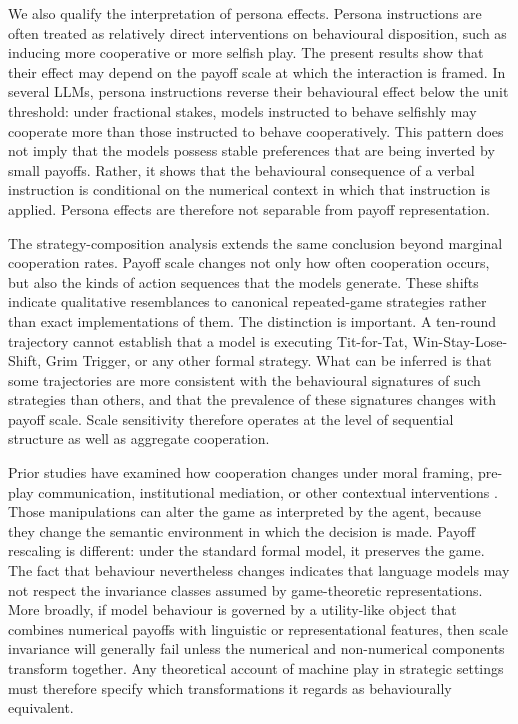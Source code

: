 \documentclass[11pt,a4paper]{article}
\begin{document}
We also qualify the interpretation of persona effects. Persona instructions are often treated as relatively direct interventions on behavioural disposition, such as inducing more cooperative or more selfish play. The present results show that their effect may depend on the payoff scale at which the interaction is framed. In several LLMs, persona instructions reverse their behavioural effect below the unit threshold: under fractional stakes, models instructed to behave selfishly may cooperate more than those instructed to behave cooperatively. This pattern does not imply that the models possess stable preferences that are being inverted by small payoffs. Rather, it shows that the behavioural consequence of a verbal instruction is conditional on the numerical context in which that instruction is applied. Persona effects are therefore not separable from payoff representation.

The strategy-composition analysis extends the same conclusion beyond marginal cooperation rates. Payoff scale changes not only how often cooperation occurs, but also the kinds of action sequences that the models generate. These shifts indicate qualitative resemblances to canonical repeated-game strategies rather than exact implementations of them. The distinction is important. A ten-round trajectory cannot establish that a model is executing Tit-for-Tat, Win-Stay-Lose-Shift, Grim Trigger, or any other formal strategy. What can be inferred is that some trajectories are more consistent with the behavioural signatures of such strategies than others, and that the prevalence of these signatures changes with payoff scale. Scale sensitivity therefore operates at the level of sequential structure as well as aggregate cooperation.


Prior studies have examined how cooperation changes under moral framing, pre-play communication, institutional mediation, or other contextual interventions \cite{buscemi2025strategic,lu2024llms,mao2025alympics,xie2026evolutionary}. Those manipulations can  alter the game as interpreted by the agent, because they change the semantic environment in which the decision is made. 
Payoff rescaling is different: under the standard formal model, it preserves the game. The fact that behaviour nevertheless changes indicates that language models may not respect the invariance classes assumed by game-theoretic representations. More broadly, if model behaviour is governed by a utility-like object that combines numerical payoffs with linguistic or representational features, then scale invariance will generally fail unless the numerical and non-numerical components transform together. Any theoretical account of machine play in strategic settings must therefore specify which transformations it regards as behaviourally equivalent.
\end{document}
